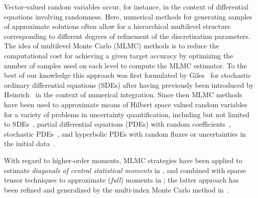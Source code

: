 \documentclass[reqno]{amsart}
\numberwithin{equation}{section}
\theoremstyle{remark}
\theoremstyle{definition}
\begin{document}
Vector-valued random variables occur, for instance,  
in the context of differential equations 
involving randomness. 
Here, numerical methods  
for generating samples of 
approximate solutions often 
allow for a hierarchical multilevel structure 
corresponding to different degrees
of refinement of the discretization parameters. 
The idea of multilevel Monte Carlo (MLMC) methods 
is to reduce the computational 
cost for achieving a given target accuracy 
by optimizing the number of samples 
used on each level 
to compute the MLMC estimator. 
To the best of our knowledge 
this approach was first formulated by Giles~\cite{Giles2008}  
for stochastic ordinary differential equations (SDEs)
after having previously been introduced 
by Heinrich~\cite{Heinrich2001} 
in the context of numerical integration. 
%
Since then MLMC methods 
have been used to approximate means 
of Hilbert space valued random variables 
for a variety of problems in uncertainty quantification, 
including but not limited to 
SDEs~\cite{CollierEtAl2015, 
	GilesMilstein2008,
	GilesDebrabantRossler2019,  
	GilesSzpruch2014, 
	XiaGiles2012}, 
%
partial differential equations (PDEs) with random 
coefficients~\cite{BarthSchwabZollinger2011, 
	CharrierScheichlTeckentrup2013, 
	CliffeGilesScheichlTeckentrup2011, 
	CollierEtAl2015, 
	GittelsonKonnoSchwabStenberg2013, 
	GrahamScheichlUllmann2016, 
	HajiAliEtAl2016,  
	TeckentrupScheichlGilesUllmann2013}, 
%
stochastic  
PDEs~\cite{BarthLangSchwab2013, 
	GilesReisinger2012}, 
%
and 
hyperbolic PDEs with random fluxes 
or uncertainties in the initial 
data~\cite{MishraRisebroSchwabTokareva2016, 
	MishraSchwab2012, 
	MishraSchwab2017}. 

With regard to higher-order moments, MLMC strategies  
have been applied to estimate 
\emph{diagonals of central 
	statistical moments} in \cite{BierigChernov2015,BierigChernov2016}, 
and combined with sparse tensor techniques  
to approximate (\emph{full}) moments 
in \cite{BarthSchwabZollinger2011,
	MishraSchwab2012, 
	MishraSchwab2017}; 
the latter approach has been refined and generalized 
by the multi-index Monte Carlo method 
in~\cite{MIMC2016}.  
\end{document}
